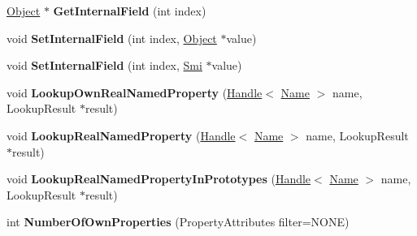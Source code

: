 \begin{DoxyCompactItemize}
\item 
\hypertarget{classv8_1_1internal_1_1_j_s_object_aa2f48f9339b6ffda374a20c712c11d21}{}\hyperlink{classv8_1_1internal_1_1_object}{Object} $\ast$ {\bfseries Get\+Internal\+Field} (int index)\label{classv8_1_1internal_1_1_j_s_object_aa2f48f9339b6ffda374a20c712c11d21}

\item 
\hypertarget{classv8_1_1internal_1_1_j_s_object_a6ef9447688a792e1bba0b22a5ea490f9}{}void {\bfseries Set\+Internal\+Field} (int index, \hyperlink{classv8_1_1internal_1_1_object}{Object} $\ast$value)\label{classv8_1_1internal_1_1_j_s_object_a6ef9447688a792e1bba0b22a5ea490f9}

\item 
\hypertarget{classv8_1_1internal_1_1_j_s_object_a0b3a575eaf15ca7641d144838e5c4816}{}void {\bfseries Set\+Internal\+Field} (int index, \hyperlink{classv8_1_1internal_1_1_smi}{Smi} $\ast$value)\label{classv8_1_1internal_1_1_j_s_object_a0b3a575eaf15ca7641d144838e5c4816}

\item 
\hypertarget{classv8_1_1internal_1_1_j_s_object_a450a7cc20a3532aa588212ed915a088b}{}void {\bfseries Lookup\+Own\+Real\+Named\+Property} (\hyperlink{classv8_1_1internal_1_1_handle}{Handle}$<$ \hyperlink{classv8_1_1internal_1_1_name}{Name} $>$ name, Lookup\+Result $\ast$result)\label{classv8_1_1internal_1_1_j_s_object_a450a7cc20a3532aa588212ed915a088b}

\item 
\hypertarget{classv8_1_1internal_1_1_j_s_object_aee85d8003dd271b2b86c59919dfea52f}{}void {\bfseries Lookup\+Real\+Named\+Property} (\hyperlink{classv8_1_1internal_1_1_handle}{Handle}$<$ \hyperlink{classv8_1_1internal_1_1_name}{Name} $>$ name, Lookup\+Result $\ast$result)\label{classv8_1_1internal_1_1_j_s_object_aee85d8003dd271b2b86c59919dfea52f}

\item 
\hypertarget{classv8_1_1internal_1_1_j_s_object_ad5b7c1cab534c71fe41b211bf4906964}{}void {\bfseries Lookup\+Real\+Named\+Property\+In\+Prototypes} (\hyperlink{classv8_1_1internal_1_1_handle}{Handle}$<$ \hyperlink{classv8_1_1internal_1_1_name}{Name} $>$ name, Lookup\+Result $\ast$result)\label{classv8_1_1internal_1_1_j_s_object_ad5b7c1cab534c71fe41b211bf4906964}

\item 
\hypertarget{classv8_1_1internal_1_1_j_s_object_ab0e51aec033bf5d9e8bab9fddf15de40}{}int {\bfseries Number\+Of\+Own\+Properties} (Property\+Attributes filter=N\+O\+N\+E)\label{classv8_1_1internal_1_1_j_s_object_ab0e51aec033bf5d9e8bab9fddf15de40}


\end{DoxyCompactItemize}
